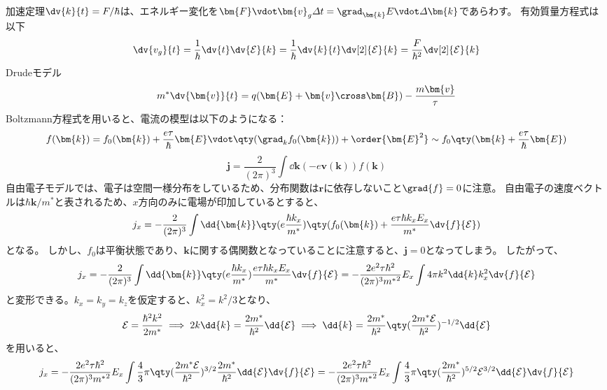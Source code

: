 


加速定理$\dv{k}{t} = F/\hbar$は、エネルギー変化を$\bm{F}\vdot\bm{v}_{g}\varDelta{}t = \grad_{\bm{k}}E\vdot\varDelta\bm{k}$であらわす。
有効質量方程式は以下
\begin{equation}
	\dv{v_g}{t} = \frac{1}{\hbar}\dv{t}\dv{\mathcal{E}}{k} = \frac{1}{\hbar}\dv{k}{t}\dv[2]{\mathcal{E}}{k} = \frac{F}{\hbar^2}\dv[2]{\mathcal{E}}{k}
\end{equation}
Drudeモデル
\begin{equation}
	m^*\dv{\bm{v}}{t} = q(\bm{E}+\bm{v}\cross\bm{B}) - \frac{m\bm{v}}{\tau}
\end{equation}
Boltzmann方程式を用いると、電流の模型は以下のようになる：
\begin{equation}
	f(\bm{k}) =  f_0(\bm{k}) + \frac{e\tau}{\hbar}\bm{E}\vdot\qty(\grad_k{f_0(\bm{k})}) + \order{\bm{E}^2} \sim f_0\qty(\bm{k} + \frac{e\tau}{\hbar}\bm{E})
\end{equation}
\begin{equation}
	\bm{j} = \frac{2}{(2\pi)^3}\int \dd{\bm{k}} (-e\bm{v}(\bm{k}))f(\bm{k})
\end{equation}
自由電子モデルでは、電子は空間一様分布をしているため、分布関数は$\bm{r}$に依存しないこと$\grad{f} = 0$に注意。
自由電子の速度ベクトルは${\hbar\bm{k}}/{m^*}$と表されるため、$x$方向のみに電場が印加しているとすると、
\begin{equation}
	j_x = -\frac{2}{(2\pi)^3}\int \dd{\bm{k}} \qty(e\frac{\hbar{}k_x}{m^*})\qty(f_0(\bm{k}) + \frac{e\tau\hbar{}k_xE_x}{m^*}\dv{f}{\mathcal{E}})
\end{equation}
となる。
しかし、$f_0$は平衡状態であり、$\bm{k}$に関する偶関数となっていることに注意すると、$\bm{j}=0$となってしまう。
したがって、
\begin{equation}
	j_x = -\frac{2}{(2\pi)^3}\int \dd{\bm{k}} \qty(e\frac{\hbar{}k_x}{m^*})\frac{e\tau\hbar{}k_xE_x}{m^*}\dv{f}{\mathcal{E}}
	= -\frac{2e^2\tau\hbar^2}{(2\pi)^3{m^*}^2}E_x\int4\pi{}k^2\dd{k}k_x^2\dv{f}{\mathcal{E}}
\end{equation}
と変形できる。$k_x=k_y=k_z$を仮定すると、$k_x^2 = k^2/3$となり、
\begin{equation}
	\mathcal{E} = \frac{\hbar^2k^2}{2m^*} \implies 2k\dd{k} = \frac{2m^*}{\hbar^2}\dd{\mathcal{E}} \implies \dd{k} = \frac{2m^*}{\hbar^2}\qty(\frac{2m^*\mathcal{E}}{\hbar^2})^{-1/2}\dd{\mathcal{E}}
\end{equation}
を用いると、
\begin{equation}
	j_x = -\frac{2e^2\tau\hbar^2}{(2\pi)^3{m^*}^2}E_x\int\frac{4}{3}\pi{}\qty(\frac{2m^*\mathcal{E}}{\hbar^2})^{3/2}\frac{2m^*}{\hbar^2}\dd{\mathcal{E}}\dv{f}{\mathcal{E}}
	= -\frac{2e^2\tau\hbar^2}{(2\pi)^3{m^*}^2}E_x\int\frac{4}{3}\pi{}\qty(\frac{2m^*}{\hbar^2})^{5/2}\mathcal{E}^{3/2}\dd{\mathcal{E}}\dv{f}{\mathcal{E}}
\end{equation}
